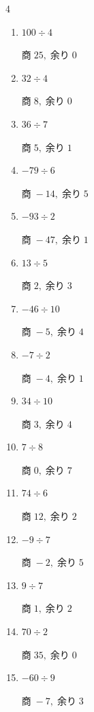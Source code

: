 \begin{multicols}{4}
\begin{enumerate}
  \item $100 \div 4$

        $商\; 25,\; 余り\; 0$

\columnbreak %

  \item $32 \div 4$

        $商\; 8,\; 余り\; 0$

  \item $36 \div 7$

        $商\; 5,\; 余り\; 1$

  \item $-79 \div 6$

        $商\; -14,\; 余り\; 5$

  \item $-93 \div 2$

        $商\; -47,\; 余り\; 1$

  \item $13 \div 5$

        $商\; 2,\; 余り\; 3$

  \item $-46 \div 10$

        $商\; -5,\; 余り\; 4$

  \item $-7 \div 2$

        $商\; -4,\; 余り\; 1$

  \item $34 \div 10$

        $商\; 3,\; 余り\; 4$

  \item $7 \div 8$

        $商\; 0,\; 余り\; 7$

  \item $74 \div 6$

        $商\; 12,\; 余り\; 2$

  \item $-9 \div 7$

        $商\; -2,\; 余り\; 5$

  \item $9 \div 7$

        $商\; 1,\; 余り\; 2$

  \item $70 \div 2$

        $商\; 35,\; 余り\; 0$

  \item $-60 \div 9$

        $商\; -7,\; 余り\; 3$


\end{enumerate}
\end{multicols}
